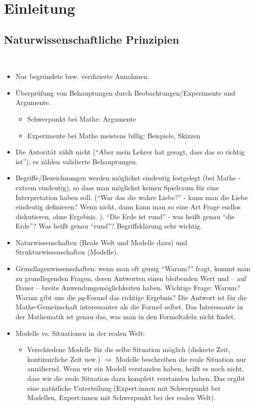 \chapter*{Einleitung}

\section{Naturwissenschaftliche Prinzipien}

\begin{bem}\ 
	\begin{itemize}
		\item Nur begründete bzw. verifizierte Annahmen. 
		\item Überprüfung von Behauptungen durch Beobachtungen/Experimente und Argumente. 
		\begin{itemize}
			\item Schwerpunkt bei Mathe: Argumente 
			\item Experimente bei Mathe meistens billig: Beispiele, Skizzen 
		\end{itemize} 
		\item Die Autorität zählt nicht (``Aber mein Lehrer hat gesagt, dass das so richtig ist''), es zählen validierte Behauptungen. 
		\item Begriffe/Bezeichnungen werden möglichst eindeutig festgelegt (bei Mathe - extrem eindeutig),  so dass man möglichst keinen Spielraum für eine Interpretation haben soll. (``War das die wahre Liebe?'' - kann man die Liebe eindeutig definieren? Wenn nicht, dann kann man so eine Art Frage endlos diskutieren, ohne Ergebnis. ). ``Die Erde ist rund'' - was heißt genau ``die Erde''? Was heißt genau ``rund''? Begriffsklärung sehr wichtig. 
		\item Naturwissenschaften (Reale Welt und Modelle dazu) und  Strukturwissenschaften (Modelle). 
		\item Grundlagenwissenschaften: wenn man oft genug ``Warum?'' fragt, kommt man zu grundlegenden Fragen, deren Antworten einen bleibenden Wert und -- auf Dauer -- breite Anwendungsmöglichkeiten haben. Wichtige Frage: Warum? Warum gibt uns die $pq$-Formel das richtige Ergebnis? Die Antwort ist für die Mathe-Gemeinschaft interessanter als die Formel selbst. Das Interessante in der Mathematik ist genau das, was man in den Formeltafeln nicht findet. 
		\item Modelle vs. Situationen in der realen Welt: 
		\begin{itemize}
			\item Verschiedene Modelle für die selbe Situation möglich (diskrete Zeit, kontinuirliche Zeit usw.) $\rightsquigarrow$ Modelle beschreiben die reale Situation nur annähernd. Wenn wir ein Modell verstanden haben, heißt es noch nicht, dass wir die reale Situation dazu komplett verstanden haben. Das ergibt eine natürliche Unterteilung (Expert:innen mit Schwerpunkt bei Modellen, Expert:innen mit Schwerpunkt bei der realen Welt). 

\end{itemize}
\end{itemize}
\end{bem}

